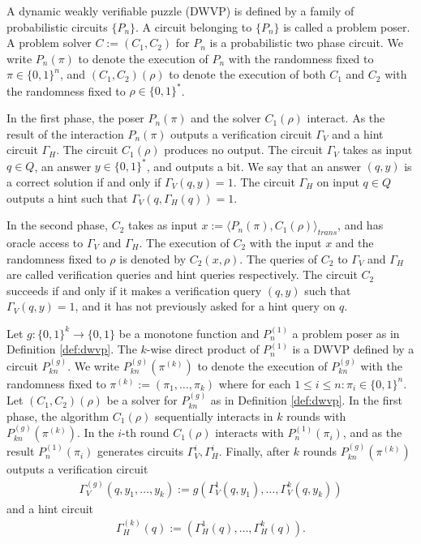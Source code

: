 \begin{definition}
  \label{def:dwvp}
  A dynamic weakly verifiable puzzle (DWVP) is defined by a family of probabilistic circuits $\{P_n\}$.
  A circuit belonging to $\{P_n\}$ is called a problem poser.
  A problem solver $C := (C_1, C_2)$ for $P_n$ is a probabilistic two phase circuit.
  We write $P_n(\pi)$ to denote the execution of $P_n$ with the randomness fixed to $\pi \in \{0,1\}^n$, and $(C_1,C_2)(\rho)$
  to denote the execution of both $C_1$ and $C_2$ with the randomness fixed to $\rho \in \{0,1\}^{*}$.

  In the first phase, the poser $P_n(\pi)$ and the solver $C_1(\rho)$ interact.
  As the result of the interaction $P_n(\pi)$ outputs a verification circuit $\Gamma_{V}$ and a hint circuit $\Gamma_{H}$.
  The circuit $C_1(\rho)$ produces no output.
  The circuit $\Gamma_{V}$ takes as input $q \in Q$, an answer $y \in \{0,1\}^*$,
  and outputs a bit. We say that an answer $(q,y)$ is a correct solution if and only if $\Gamma_V(q,y) = 1$.
  The circuit $\Gamma_H$ on input $q \in Q$ outputs a hint such that $\Gamma_V(q,\Gamma_H(q)) = 1$.

  In the second phase, $C_2$ takes as input $x := \langle P_n(\pi), C_1(\rho) \rangle_{\mathit{trans}}$,
  and has oracle access to $\Gamma_V$ and $\Gamma_H$.
  The execution of $C_2$ with the input $x$ and the randomness fixed to $\rho$
  is denoted by $C_2(x, \rho)$. The queries of $C_2$ to $\Gamma_V$ and $\Gamma_H$ are called verification queries and hint queries respectively.
  The circuit $C_2$ succeeds if and only if it makes a verification query $(q,y)$ such that $\Gamma_V(q,y) = 1$,
  and it has not previously asked for a hint query on $q$.
\end{definition}
%
\begin{definition}
  Let $g: \{0,1\}^{k} \rightarrow \{0,1\}$ be a monotone function and $P_n^{(1)}$ a problem poser as in Definition \ref{def:dwvp}.
  The $k$-wise direct product of $P_n^{(1)}$ is a DWVP defined by a circuit $P_{kn}^{(g)}$.
  We write $P_{kn}^{(g)}(\pi^{(k)})$ to denote the execution of $P_{kn}^{(g)}$ with the randomness fixed to $\pi^{(k)} := (\pi_1, \dots, \pi_k)$
  where for each $1 \leq i \leq n : \pi_i \in \{0,1\}^n.$
  Let $(C_1, C_2)(\rho)$ be a solver for $P_{kn}^{(g)}$ as in Definition \ref{def:dwvp}.
  In the first phase, the algorithm $C_1(\rho)$ sequentially interacts in $k$ rounds with $P_{kn}^{(g)}(\pi^{(k)})$.
  In the $i$-th round $C_1(\rho)$ interacts with $P_n^{(1)}(\pi_i)$,
  and as the result $P_{n}^{(1)}(\pi_i)$ generates circuits $\Gamma_V^i, \Gamma_H^i$.
  Finally, after $k$ rounds $P_{kn}^{(g)}(\pi^{(k)})$ outputs a verification circuit
\begin{align*}
  \Gamma_V^{(g)} (q, y_1, \dots, y_k) := g(\Gamma_V^{1}(q, y_1), \dots, \Gamma_V^{k}(q, y_k))
\end{align*}
and a hint circuit
\begin{align*}
  \Gamma_H^{(k)} (q) := (\Gamma_H^{1}(q), \dots, \Gamma_H^{k}(q)).
\end{align*}
\end{definition}
